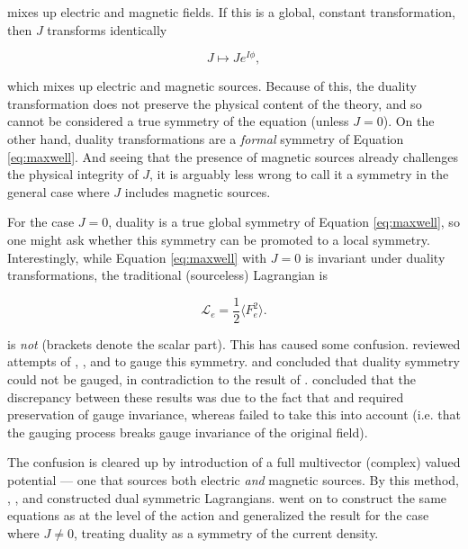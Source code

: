 \documentclass{article}
\begin{document}
  mixes up electric and magnetic fields. If this is a global, constant transformation, then $J$ transforms identically

  \begin{equation}
    J \mapsto J e^{I \phi},
  \end{equation}

  which mixes up electric and magnetic sources. Because of this, the duality transformation does not preserve the physical content of the theory, and so cannot be considered a true symmetry of the equation (unless $J=0$). On the other hand, duality transformations are a \emph{formal} symmetry of Equation \ref{eq:maxwell}. And seeing that the presence of magnetic sources already challenges the physical integrity of $J$, it is arguably less wrong to call it a symmetry in the general case where $J$ includes magnetic sources.

  For the case $J=0$, duality is a true global symmetry of Equation \ref{eq:maxwell}, so one might ask whether this symmetry can be promoted to a local symmetry. Interestingly, while Equation \ref{eq:maxwell} with $J=0$ is invariant under duality transformations, the traditional (sourceless) Lagrangian is

  \begin{equation}
    \mathcal{L}_e = \frac{1}{2} \langle F_e^2 \rangle.
  \end{equation}

  is \emph{not} (brackets denote the scalar part). This has caused some confusion. \cite{saa} reviewed attempts of \cite{malik}, \cite{bunster}, and \cite{deser} to gauge this symmetry. \cite{bunster} and \cite{deser} concluded that duality symmetry could not be gauged, in contradiction to the result of \cite{malik}. \cite{saa} concluded that the discrepancy between these results was due to the fact that \cite{bunster} and \cite{deser} required preservation of gauge invariance, whereas \cite{malik} failed to take this into account (i.e. that the gauging process breaks gauge invariance of the original field).

  The confusion is cleared up by introduction of a full multivector (complex) valued potential --- one that sources both electric \emph{and} magnetic sources. By this method, \cite{dressel}, \cite{tiwari}, and \cite{vasconcellos}  constructed dual symmetric Lagrangians. \cite{tiwari} went on to construct the same equations as \cite{malik} at the level of the action and generalized the result for the case where $J \not= 0$, treating duality as a symmetry of the current density. 
\end{document}
